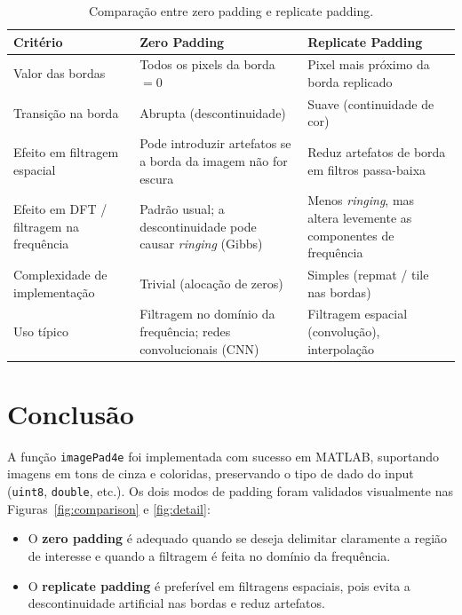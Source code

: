 \documentclass[12pt,a4paper]{article}
\begin{document}
\begin{table}[ht]
  \centering
  \caption{Comparação entre zero padding e replicate padding.}
  \label{tab:compare}
  \begin{tabular}{p{3.5cm}p{5cm}p{5cm}}
    \toprule
    \textbf{Critério} & \textbf{Zero Padding} & \textbf{Replicate Padding} \\
    \midrule
    Valor das bordas &
      Todos os pixels da borda $= 0$ &
      Pixel mais próximo da borda replicado \\
    \addlinespace
    Transição na borda &
      Abrupta (descontinuidade) &
      Suave (continuidade de cor) \\
    \addlinespace
    Efeito em filtragem espacial &
      Pode introduzir artefatos se a borda da imagem não for escura &
      Reduz artefatos de borda em filtros passa-baixa \\
    \addlinespace
    Efeito em DFT / filtragem na frequência &
      Padrão usual; a descontinuidade pode causar \emph{ringing} (Gibbs) &
      Menos \emph{ringing}, mas altera levemente as componentes de frequência &    \\
    \addlinespace
    Complexidade de implementação &
      Trivial (alocação de zeros) &
      Simples (repmat / tile nas bordas) \\
    \addlinespace
    Uso típico &
      Filtragem no domínio da frequência; redes convolucionais (CNN) &
      Filtragem espacial (convolução), interpolação \\
    \bottomrule
  \end{tabular}
\end{table}

\section{Conclusão}

A função \texttt{imagePad4e} foi implementada com sucesso em MATLAB, suportando
imagens em tons de cinza e coloridas, preservando o tipo de dado do input
(\texttt{uint8}, \texttt{double}, etc.). Os dois modos de padding foram
validados visualmente nas Figuras~\ref{fig:comparison} e \ref{fig:detail}:

\begin{itemize}
  \item O \textbf{zero padding} é adequado quando se deseja delimitar
        claramente a região de interesse e quando a filtragem é feita no
        domínio da frequência.
  \item O \textbf{replicate padding} é preferível em filtragens espaciais,
        pois evita a descontinuidade artificial nas bordas e reduz
        artefatos.
\end{itemize}
\end{document}
